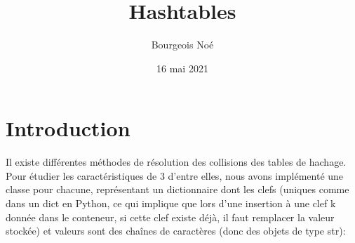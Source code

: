 \documentclass[utf8]{article}
\title{Hashtables}
\author{Bourgeois Noé}
\date{16 mai 2021}
\begin{document}
\maketitle
\tableofcontents

\newpage


\section{Introduction}
 Il existe différentes méthodes de résolution des collisions des tables de hachage.
 Pour étudier les caractéristiques de 3 d'entre elles, nous avons implémenté une classe pour chacune, représentant un dictionnaire dont les clefs (uniques comme dans un dict en Python, ce qui implique que lors d’une insertion à une clef k donnée dans le conteneur, si cette clef existe déjà, il faut remplacer la valeur stockée) et valeurs sont des chaînes de caractères (donc des objets de type str):
\end{document}
